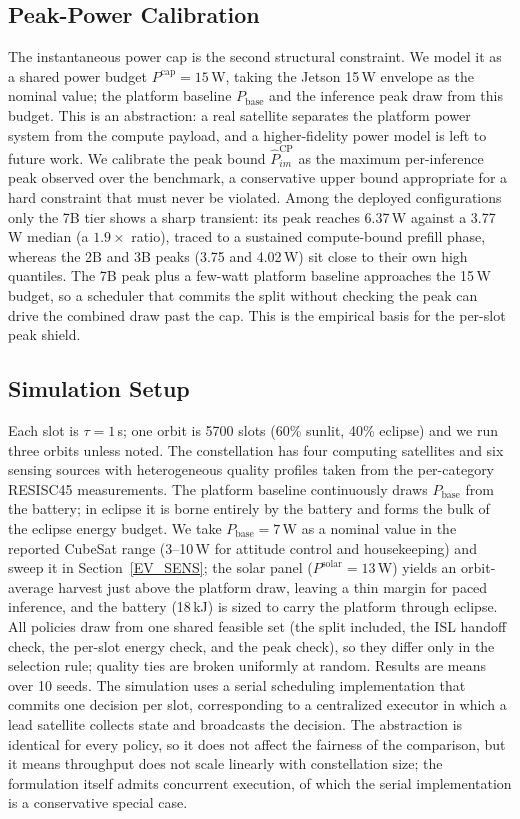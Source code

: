 \subsection{Peak-Power Calibration}\label{EV_PEAK}
The instantaneous power cap is the second structural constraint. We model it as
a shared power budget $P^{\text{cap}}{=}15$\,W, taking the Jetson 15\,W
envelope as the nominal value; the platform baseline $P_{\text{base}}$ and the
inference peak draw from this budget. This is an abstraction: a real satellite
separates the platform power system from the compute payload, and a
higher-fidelity power model is left to future work. We calibrate the peak bound
$\hat{P}_{im}^{\text{CP}}$ as the maximum per-inference peak observed over the
benchmark, a conservative upper bound appropriate for a hard constraint that
must never be violated. Among the deployed configurations only the 7B tier
shows a sharp transient: its peak reaches 6.37\,W against a 3.77\,W median (a
$1.9\times$ ratio), traced to a sustained compute-bound prefill phase, whereas
the 2B and 3B peaks (3.75 and 4.02\,W) sit close to their own high quantiles.
The 7B peak plus a few-watt platform baseline approaches the 15\,W budget, so a
scheduler that commits the split without checking the peak can drive the
combined draw past the cap. This is the empirical basis for the per-slot peak
shield.

\subsection{Simulation Setup}\label{EV_SETUP}
Each slot is $\tau{=}1$\,s; one orbit is 5700 slots (60\% sunlit, 40\% eclipse)
and we run three orbits unless noted. The constellation has four computing
satellites and six sensing sources with heterogeneous quality profiles taken
from the per-category RESISC45 measurements. The platform baseline continuously
draws $P_{\text{base}}$ from the battery; in eclipse it is borne entirely by
the battery and forms the bulk of the eclipse energy budget. We take
$P_{\text{base}}{=}7$\,W as a nominal value in the reported CubeSat range
(3--10\,W for attitude control and housekeeping) and sweep it in
Section~\ref{EV_SENS}; the solar panel ($P^{\text{solar}}{=}13$\,W) yields an
orbit-average harvest just above the platform draw, leaving a thin margin for
paced inference, and the battery (18\,kJ) is sized to carry the platform
through eclipse. All policies draw from one shared feasible set (the split
included, the ISL handoff check, the per-slot energy check, and the peak
check), so they differ only in the selection rule; quality ties are broken
uniformly at random. Results are means over 10 seeds. The simulation uses a
serial scheduling implementation that commits one decision per slot,
corresponding to a centralized executor in which a lead satellite collects
state and broadcasts the decision. The abstraction is identical for every
policy, so it does not affect the fairness of the comparison, but it means
throughput does not scale linearly with constellation size; the formulation
itself admits concurrent execution, of which the serial implementation is a
conservative special case.

